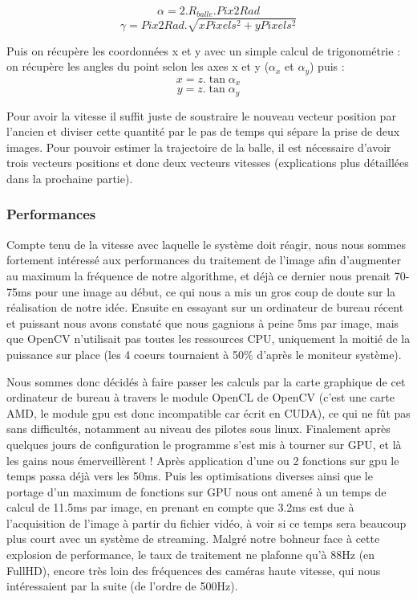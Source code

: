 $$ \alpha = 2.R_{balle}.Pix2Rad $$ 
$$ \gamma = Pix2Rad.\sqrt{xPixels^2 + yPixels^2} $$

Puis on récupère les coordonnées x et y avec un simple calcul de trigonométrie : on récupère les angles du point selon les axes x et y ($\alpha _x$ et $\alpha _y$) puis :
$$ x = z.\tan \alpha _x $$
$$ y = z.\tan \alpha _y $$


Pour avoir la vitesse il suffit juste de soustraire le nouveau vecteur position par l'ancien et diviser cette quantité par le pas de temps qui sépare la prise de deux images. Pour pouvoir estimer la trajectoire de la balle, il est nécessaire d'avoir trois vecteurs positions et donc deux vecteurs vitesses (explications plus détaillées dans la prochaine partie). 


\subsubsection{Performances}

Compte tenu de la vitesse avec laquelle le système doit réagir, nous nous sommes fortement intéressé aux performances du traitement de l'image afin d'augmenter au maximum la fréquence de notre algorithme, et déjà ce dernier nous prenait 70-75ms pour une image au début, ce qui nous a mis un gros coup de doute sur la réalisation de notre idée. Ensuite en essayant sur un ordinateur de bureau récent et puissant nous avons constaté que nous gagnions à peine 5ms par image, mais que OpenCV n'utilisait pas toutes les ressources CPU, uniquement la moitié de la puissance sur place (les 4 coeurs tournaient à 50\% d'après le moniteur système). 

Nous sommes donc décidés à faire passer les calculs par la carte graphique de cet ordinateur de bureau à travers le module OpenCL de OpenCV (c'est une carte AMD, le module gpu est donc incompatible car écrit en CUDA), ce qui ne fût pas sans difficultés, notamment au niveau des pilotes sous linux. Finalement après quelques jours de configuration le programme s'est mis à tourner sur GPU, et là les gains nous émerveillèrent ! Après application d'une ou 2 fonctions sur gpu le temps passa déjà vers les 50ms. Puis les optimisations diverses ainsi que le portage d'un maximum de fonctions sur GPU nous ont amené à un temps de calcul de 11.5ms par image, en prenant en compte que 3.2ms est due à l'acquisition de l'image à partir du fichier vidéo, à voir si ce temps sera beaucoup plus court avec un système de streaming. Malgré notre bohneur face à cette explosion de performance, le taux de traitement ne plafonne qu'à 88Hz (en FullHD), encore très loin des fréquences des caméras haute vitesse, qui nous intéressaient par la suite (de l'ordre de 500Hz).

